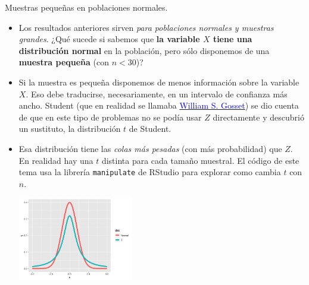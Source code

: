 \documentclass[
  9pt,
  ignorenonframetext,
]{beamer}
\begin{document}
\begin{frame}[fragile]{Muestras pequeñas en poblaciones normales.}
\protect\hypertarget{muestras-pequenas-en-poblaciones-normales.}{}

\begin{itemize}
\item
  Los resultados anteriores sirven \emph{para poblaciones normales y
  muestras grandes}. ¿Qué sucede si sabemos que \textbf{la variable
  \(X\) tiene una distribución normal} en la población, pero sólo
  disponemos de una \textbf{muestra pequeña} (con \(n < 30\))?
\item
  Si la muestra es pequeña disponemos de menos información sobre la
  variable \(X\). Eso debe traducirse, necesariamente, en un intervalo
  de confianza más ancho. Student (que en realidad se llamaba
  \href{https://es.wikipedia.org/wiki/William_Sealy_Gosset}{\textcolor{blue}{William S. Gosset}})
  se dio cuenta de que en este tipo de problemas no se podía usar \(Z\)
  directamente y descubrió un sustituto, la distribución \(t\) de
  Student.
\item
  Esa distribución tiene las \emph{colas más pesadas} (con más
  probabilidad) que \(Z\). En realidad hay una \(t\) distinta para cada
  tamaño muestral. El código de este tema usa la librería
  \texttt{manipulate} de RStudio para explorar como cambia \(t\) con
  \(n\).

  \begin{center}\includegraphics[width=5cm]{../fig/06-04-TvsZ} \end{center}
\end{itemize}

\end{frame}
\end{document}
